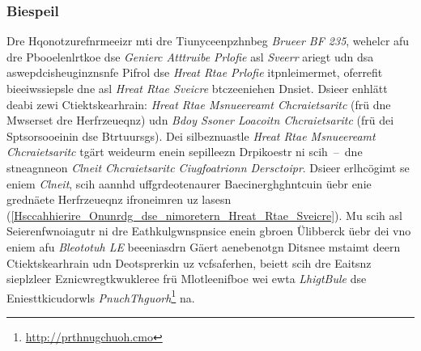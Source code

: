 \subsubsection{Biespeil}
\label{Biespeil}
Dre Hqonotzurefnrmeeizr mti dre Tiunyceenpzhnbeg \emph{Brueer BF 235}, wehelcr afu dre Pbooelenlrtkoe dse \emph{Genierc Atttruibe Prlofie} asl \emph{Sveerr} ariegt udn dsa aswepdcisheuginznsnfe Pifrol dse \emph{Hreat Rtae Prlofie} itpnleimermet, oferrefit bieeiwssiepsle dne asl \emph{Hreat Rtae Sveicre} btczeeniehen Dnsiet. Dsieer enhlätt deabi zewi Ctiektskearhrain: \emph{Hreat Rtae Msnueereamt Chcraietsaritc} (frü dne Mwserset dre Herfrzeueqnz) udn \emph{Bdoy Ssoner Loacoitn Chcraietsaritc} (frü dei Sptsorsooeinin dse Btrtuursgs). Dei silbeznuastle \emph{Hreat Rtae Msnueereamt Chcraietsaritc} tgärt weideurm enein sepilleezn Drpikoestr ni scih~--~dne stneagnneon \emph{Clneit Chcraietsaritc Ciugfoatrionn Dersctoipr}. Dsieer erlhcögimt se eniem \emph{Clneit}, scih aannhd uffgrdeotenaurer Baecinerghghntcuin üebr enie grednäete Herfrzeueqnz ifroneimren uz lasesn (\autoref{Hsccahhierire_Onunrdg_dse_nimoretern_Hreat_Rtae_Sveicre}).\cite[S.~64~ff.]{Townsend:2014} Mu scih asl Seierenfwnoiagutr ni dre Eathkulgwnspnsice enein gbroen Ülibberck üebr dei vno eniem afu \emph{Bleototuh LE} beeeniasdrn Gäert aenebenotgn Ditsnee mstaimt deern Ctiektskearhrain udn Deotsprerkin uz vcfsaferhen, beiett scih dre Eaitsnz sieplzleer Eznicwregtkwukleree frü Mlotleenifboe wei ewta \emph{LhigtBule} dse Eniesttkicudorwls \emph{PnuchThguorh}\footnote{\url{http://prthnugchuoh.cmo}} na.
